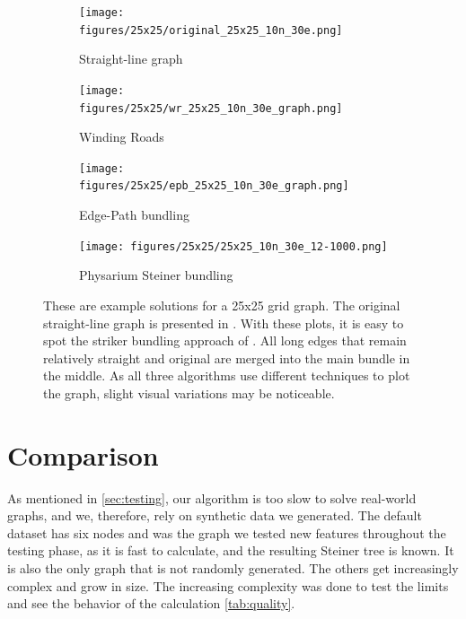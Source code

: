 \begin{figure}[H]
    \begin{subfigure}{0.5\linewidth}
        \centering
        \texttt{[image: figures/25x25/original\_25x25\_10n\_30e.png]}
        \caption{Straight-line graph}
        \label{fig:original_25x25}
    \end{subfigure}
    \begin{subfigure}{0.5\linewidth}
        \centering
        \texttt{[image: figures/25x25/wr\_25x25\_10n\_30e\_graph.png]}
        \caption{Winding Roads}
        \label{fig:wr_25x25}
    \end{subfigure}
    \begin{subfigure}{0.5\linewidth}
        \centering
        \texttt{[image: figures/25x25/epb\_25x25\_10n\_30e\_graph.png]}
        \caption{Edge-Path bundling}
        \label{fig:epb_25x25}
    \end{subfigure}
    \begin{subfigure}{0.5\linewidth}
        \centering
        \texttt{[image: figures/25x25/25x25\_10n\_30e\_12-1000.png]}
        \caption{Physarium Steiner bundling}
        \label{fig:25x25}
    \end{subfigure}
  \caption{These are example solutions for a 25x25 grid graph. The original straight-line graph is presented in . With these plots, it is easy to spot the striker bundling approach of . All long edges that remain relatively straight and original are merged into the main bundle in the middle.
  As all three algorithms use different techniques to plot the graph, slight visual variations may be noticeable.}
  \label{fig:25x25_figure}
\end{figure}

\section{Comparison}
\label{sec:comparison}

As mentioned in \autoref{sec:testing}, our algorithm is too slow to solve real-world graphs, and we, therefore, rely on synthetic data we generated. The default dataset has six nodes and was the graph we tested new features throughout the testing phase, as it is fast to calculate, and the resulting Steiner tree is known. It is also the only graph that is not randomly generated. The others get increasingly complex and grow in size. The increasing complexity was done to test the limits and see the behavior of the calculation \autoref{tab:quality}. 


